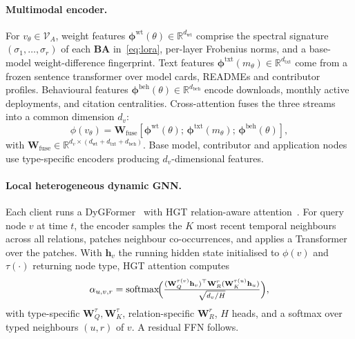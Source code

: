 \documentclass[11pt]{article}
\theoremstyle{plain}
\theoremstyle{definition}
\theoremstyle{remark}
\newcommand{\R}{\mathbb{R}}
\newcommand{\Vcal}{\mathcal{V}}
\newcommand{\softmax}{\mathrm{softmax}}
\begin{document}
\paragraph{Multimodal encoder.}
For $v_\theta\!\in\!\Vcal_A$, weight features
$\bm{\phi}^{\mathrm{wt}}(\theta)\!\in\!\R^{d_{\mathrm{wt}}}$
comprise the spectral signature $(\sigma_1,\ldots,\sigma_r)$ of each
$\mathbf{B}\mathbf{A}$ in~\eqref{eq:lora}, per-layer Frobenius
norms, and a base-model weight-difference fingerprint. Text
features $\bm{\phi}^{\mathrm{txt}}(m_\theta)\!\in\!\R^{d_{\mathrm{txt}}}$
come from a frozen sentence transformer over model cards, READMEs
and contributor profiles. Behavioural features
$\bm{\phi}^{\mathrm{beh}}(\theta)\!\in\!\R^{d_{\mathrm{beh}}}$
encode downloads, monthly active deployments, and citation
centralities. Cross-attention fuses the three streams into a
common dimension $d_v$:
\begin{equation}
\phi(v_\theta) = \mathbf{W}_{\mathrm{fuse}}
[\bm{\phi}^{\mathrm{wt}}(\theta);\, \bm{\phi}^{\mathrm{txt}}(m_\theta);\,
\bm{\phi}^{\mathrm{beh}}(\theta)],
\label{eq:fused}
\end{equation}
with $\mathbf{W}_{\mathrm{fuse}}\!\in\!\R^{d_v\times
(d_{\mathrm{wt}}+d_{\mathrm{txt}}+d_{\mathrm{beh}})}$. Base
model, contributor and application nodes use type-specific
encoders producing $d_v$-dimensional features.

\paragraph{Local heterogeneous dynamic GNN.}
Each client runs a DyGFormer~\cite{yu2023dygformer} with HGT
relation-aware attention~\cite{hu2020hgt}. For query node $v$ at
time $t$, the encoder samples the $K$ most recent temporal
neighbours across all relations, patches neighbour co-occurrences,
and applies a Transformer over the patches. With $\mathbf{h}_v$ the
running hidden state initialised to $\phi(v)$ and $\tau(\cdot)$
returning node type, HGT attention computes
\begin{equation}
\alpha_{u, v, r} = \softmax\!\Bigl(\tfrac{(\mathbf{W}_Q^{\tau(v)} \mathbf{h}_v)^\top \mathbf{W}_R^r (\mathbf{W}_K^{\tau(u)} \mathbf{h}_u)}{\sqrt{d_v / H}}\Bigr),
\label{eq:hgt}
\end{equation}
with type-specific $\mathbf{W}_Q^{\tau},\mathbf{W}_K^{\tau}$,
relation-specific $\mathbf{W}_R^r$, $H$ heads, and a softmax over
typed neighbours $(u,r)$ of $v$. A residual FFN follows.
\end{document}
